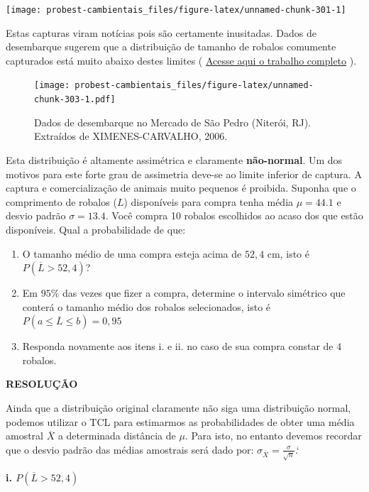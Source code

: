 \documentclass[
]{book}
\providecommand{\tightlist}{%
  \setlength{\itemsep}{0pt}\setlength{\parskip}{0pt}}
\begin{document}
\texttt{[image: probest-cambientais\_files/figure-latex/unnamed-chunk-301-1]}

Estas capturas viram notícias pois são certamente inusitadas. Dados de desembarque sugerem que a distribuição de tamanho de robalos comumente capturados está muito abaixo destes limites \citep{ximanes-carvalo2006} ( \href{http://repositorio.ufc.br/bitstream/riufc/1312/1/2006_dis_moxcarvalho.pdf}{Acesse aqui o trabalho completo} ).

\begin{figure}
\centering
\texttt{[image: probest-cambientais\_files/figure-latex/unnamed-chunk-303-1.pdf]}
\caption{\label{fig:unnamed-chunk-303}Dados de desembarque no Mercado de São Pedro (Niterói, RJ). Extraídos de XIMENES-CARVALHO, 2006.}
\end{figure}

Esta distribuição é altamente assimétrica e claramente \textbf{não-normal}. Um dos motivos para este forte grau de assimetria deve-se ao limite inferior de captura. A captura e comercialização de animais muito pequenos é proibida. Suponha que o comprimento de robalos (\(L\)) disponíveis para compra tenha média \(\mu = 44.1\) e desvio padrão \(\sigma = 13.4\). Você compra 10 robalos escolhidos ao acaso dos que estão disponíveis. Qual a probabilidade de que:

\begin{enumerate}
\def\labelenumi{\roman{enumi}.}
\tightlist
\item
  O tamanho médio de uma compra esteja acima de \(52,4\) cm, isto é \(P(\overline{L} > 52,4)\)?
\item
  Em \(95\%\) das vezes que fizer a compra, determine o intervalo simétrico que conterá o tamanho médio dos robalos selecionados, isto é \(P(a \le \overline{L} \le b) = 0,95\)
\item
  Responda novamente aos itens i. e ii. no caso de sua compra constar de \(4\) robalos.
\end{enumerate}

\textbf{RESOLUÇÃO}

Ainda que a distribuição original claramente não siga uma distribuição normal, podemos utilizar o TCL para estimarmos as probabilidades de obter uma média amostral \(\overline{X}\) a determinada distância de \(\mu\). Para isto, no entanto devemos recordar que o desvio padrão das médias amostrais será dado por: \(\sigma_{\overline{X}} = \frac{\sigma}{\sqrt{n}}\).`

\textbf{i. \(P(\overline{L} > 52,4)\)}
\end{document}
